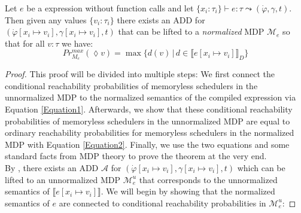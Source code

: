 \begin{lemma}\label{NormalizedCorrespondenceLemma}
	Let $e$ be a \NDICE expression without function calls 
	and let $\{x_i\colon \tau_i\} \vdash e \colon \tau \leadsto (\dot{\varphi}, \gamma, t)$. Then given any values $\{v_i\colon \tau_i\}$ there exists an ADD for $(\dot{\varphi}[x_i\mapsto v_i], \gamma[x_i\mapsto v_i], t)$ that can be lifted to a \textit{normalized} MDP $\mathcal{M}_e$ so that for all $v \colon \tau$ we have:
	$$ Pr^{max}_{M_e} (\lozenge v) = \max \{d(v) \,|\, d \in \llbracket e[x_i\mapsto v_i]\rrbracket_D\}$$
\end{lemma}
\begin{proof}
	This proof will be divided into multiple steps:
	We first connect the conditional reachability probabilities of memoryless schedulers in the unnormalized MDP to the normalized semantics of the compiled expression via Equation \ref{Equation1}.
	Afterwards, we show that these conditional reachability probabilities of memoryless schedulers in the unnormalized MDP are equal to ordinary reachability probabilities for memoryless schedulers in the normalized MDP with Equation \ref{Equation2}.
	Finally, we use the two equations and some standard facts from MDP theory to prove the theorem at the very end.\\
	
	By , there exists an ADD $\mathcal{A}$ for $(\dot{\varphi}[x_i\mapsto v_i], \gamma[x_i\mapsto v_i], t)$ which can be lifted to an unnormalized MDP $\mathcal{M}^u_e$ that corresponds to the unnormalized semantics of $\llbracket e[x_i\mapsto v_i] \rrbracket$.
	We will begin by showing that the normalized semantics of $e$ are connected to conditional reachability probabilities in $\mathcal{M}^u_e$:
	

\end{proof}
